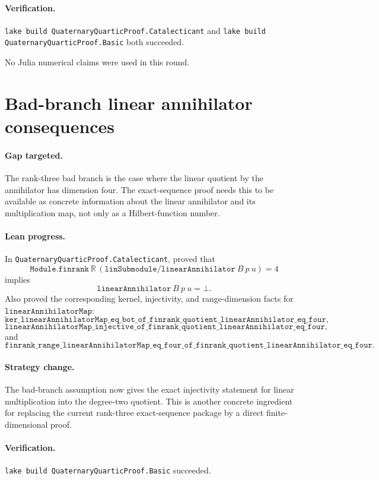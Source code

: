 \documentclass[11pt]{article}
\begin{document}
\paragraph{Verification.}
\texttt{lake build QuaternaryQuarticProof.Catalecticant} and
\texttt{lake build QuaternaryQuarticProof.Basic} both succeeded.

No Julia numerical claims were used in this round.

\section*{Bad-branch linear annihilator consequences}

\paragraph{Gap targeted.}
The rank-three bad branch is the case where the linear quotient by the
annihilator has dimension four.  The exact-sequence proof needs this to be
available as concrete information about the linear annihilator and its
multiplication map, not only as a Hilbert-function number.

\paragraph{Lean progress.}
In \texttt{QuaternaryQuarticProof.Catalecticant}, proved that
\[
\texttt{Module.finrank}\ \mathbb{R}\,
  (\texttt{linSubmodule} / \texttt{linearAnnihilator}\ B\ p\ u)=4
\]
implies
\[
\texttt{linearAnnihilator}\ B\ p\ u=\bot.
\]
Also proved the corresponding kernel, injectivity, and range-dimension facts
for \(\texttt{linearAnnihilatorMap}\):
\[
\texttt{ker\_linearAnnihilatorMap\_eq\_bot\_of\_finrank\_quotient\_linearAnnihilator\_eq\_four},
\]
\[
\texttt{linearAnnihilatorMap\_injective\_of\_finrank\_quotient\_linearAnnihilator\_eq\_four},
\]
and
\[
\texttt{finrank\_range\_linearAnnihilatorMap\_eq\_four\_of\_finrank\_quotient\_linearAnnihilator\_eq\_four}.
\]

\paragraph{Strategy change.}
The bad-branch assumption now gives the exact injectivity statement for
linear multiplication into the degree-two quotient.  This is another concrete
ingredient for replacing the current rank-three exact-sequence package by a
direct finite-dimensional proof.

\paragraph{Verification.}
\texttt{lake build QuaternaryQuarticProof.Basic} succeeded.
\end{document}
